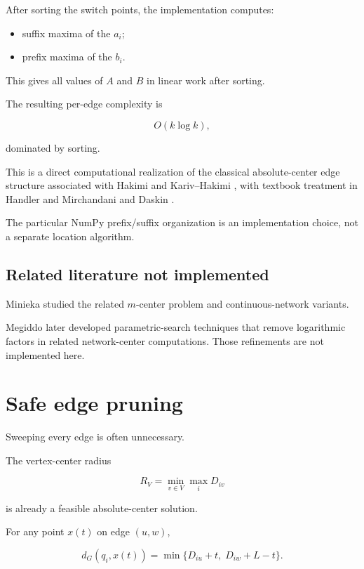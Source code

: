 \documentclass[11pt]{article}
\begin{document}
After sorting the switch points, the implementation computes:

\begin{itemize}[leftmargin=1.5em]

\item suffix maxima of the \(a_i\);

\item prefix maxima of the \(b_i\).

\end{itemize}

This gives all values of \(A\) and \(B\) in linear work after sorting.

The resulting per-edge complexity is

\[
O(k\log k),
\]

dominated by sorting.

This is a direct computational realization of the classical absolute-center
edge structure associated with Hakimi and Kariv--Hakimi
\cite{Hakimi1964,KarivHakimi1979a}, with textbook treatment in Handler and
Mirchandani \cite{HandlerMirchandani1979} and Daskin
\cite{Daskin2013}.

The particular NumPy prefix/suffix organization is an implementation choice,
not a separate location algorithm.

\subsection{Related literature not implemented}

Minieka \cite{Minieka1970} studied the related \(m\)-center problem and
continuous-network variants.

Megiddo \cite{Megiddo1983} later developed parametric-search techniques that
remove logarithmic factors in related network-center computations. Those
refinements are not implemented here.

\section{Safe edge pruning}

Sweeping every edge is often unnecessary.

The vertex-center radius

\[
R_V
=
\min_{v\in V}\max_iD_{iv}
\]

is already a feasible absolute-center solution.

For any point \(x(t)\) on edge \((u,w)\),

\[
d_G(q_i,x(t))
=
\min\{D_{iu}+t,\;D_{iw}+L-t\}.
\]
\end{document}

